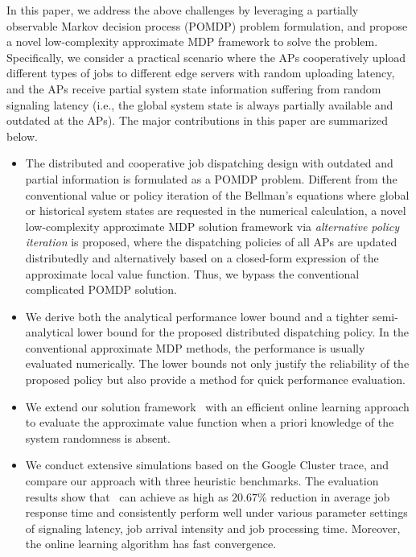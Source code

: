 In this paper, we address the above challenges by leveraging a partially observable Markov decision process (POMDP) problem formulation, and propose a novel low-complexity approximate MDP framework to solve the problem.
Specifically, we consider a practical scenario where the APs cooperatively upload different types of jobs to different edge servers with random uploading latency, and the APs receive partial system state information suffering from random signaling latency (i.e., the global system state is always partially available and outdated at the APs).
The major contributions in this paper are summarized below.
\begin{itemize}
    \item The distributed and cooperative job dispatching design with outdated and partial information is formulated as a POMDP problem.
    Different from the conventional value or policy iteration of the Bellman's equations where global or historical system states are requested in the numerical calculation, a novel low-complexity approximate MDP solution framework via \emph{alternative policy iteration} is proposed, where the dispatching policies of all APs are updated distributedly and alternatively based on a closed-form expression of the approximate local value function.
    Thus, we bypass the conventional complicated POMDP solution.
    \item We derive both the analytical performance lower bound and a tighter semi-analytical lower bound for the proposed distributed dispatching policy. In the conventional approximate MDP methods, the performance is usually evaluated numerically.
    The lower bounds not only justify the reliability of the proposed policy but also provide a method for quick performance evaluation.
    \item We extend our solution framework \algname~with an efficient online learning approach to evaluate the approximate value function when a priori knowledge of the system randomness is absent.
    \item We conduct extensive simulations based on the Google Cluster trace, and compare our approach with three heuristic benchmarks. The evaluation results show that \algname~can achieve as high as $20.67\%$ reduction in average job response time and consistently perform well under various parameter settings of signaling latency, job arrival intensity and job processing time. Moreover, the online learning algorithm has fast convergence.
\end{itemize}


